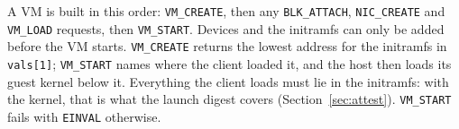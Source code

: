 \documentclass[11pt,a4paper]{report}
\begin{document}
A VM is built in this order: \texttt{VM\_CREATE}, then any
\texttt{BLK\_ATTACH}, \texttt{NIC\_CREATE} and \texttt{VM\_LOAD} requests,
then \texttt{VM\_START}. Devices and the initramfs can only be added before
the VM starts. \texttt{VM\_CREATE} returns the lowest address for the
initramfs in \texttt{vals[1]}; \texttt{VM\_START} names where the client
loaded it, and the host then loads its guest kernel below it. Everything
the client loads must lie in the initramfs: with the kernel, that is what
the launch digest covers (Section~\ref{sec:attest}). \texttt{VM\_START}
fails with \texttt{EINVAL} otherwise.
\end{document}
